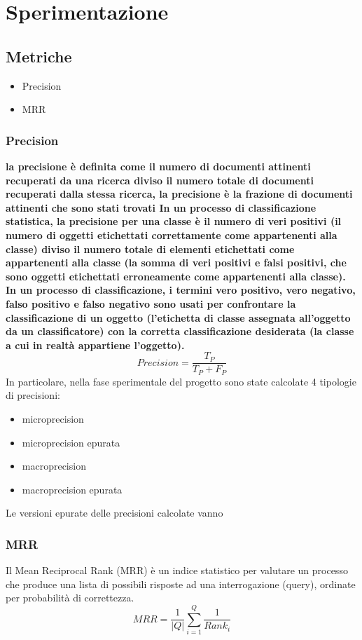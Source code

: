 \section{Sperimentazione}
\label{experiment}


\subsection{Metriche}
\label{metriche}
\begin{itemize}
\item Precision
\item MRR
\end{itemize}
\subsubsection{Precision}
\textbf{la precisione è definita come il numero di documenti attinenti recuperati da una ricerca diviso il numero totale di documenti recuperati dalla stessa ricerca,
la precisione è la frazione di documenti attinenti che sono stati trovati
In un processo di classificazione statistica, la precisione per una classe è il numero di veri positivi (il numero di oggetti etichettati correttamente come appartenenti alla classe) diviso il numero totale di elementi etichettati come appartenenti alla classe (la somma di veri positivi e falsi positivi, che sono oggetti etichettati erroneamente come appartenenti alla classe).
In un processo di classificazione, i termini vero positivo, vero negativo, falso positivo e falso negativo sono usati per confrontare la classificazione di un oggetto (l’etichetta di classe assegnata all’oggetto da un classificatore) con la corretta classificazione desiderata (la classe a cui in realtà appartiene l’oggetto).}
$$
Precision =\frac{T_P}{T_P+F_P}
$$
In particolare, nella fase sperimentale del progetto sono state calcolate 4 tipologie di precisioni:
\begin{itemize}
\item microprecision
\item microprecision epurata
\item macroprecision
\item macroprecision epurata
\end{itemize}
Le versioni epurate delle precisioni calcolate vanno
\subsubsection{MRR}
Il Mean Reciprocal Rank (MRR) è un indice statistico per valutare un processo che produce una lista di possibili risposte ad una interrogazione (query), ordinate per probabilità di correttezza.
\begin{equation}
MRR = \frac{1}{|Q|}\sum_{i=1}^{Q}{\frac{1}{Rank_i}}
\end{equation}

